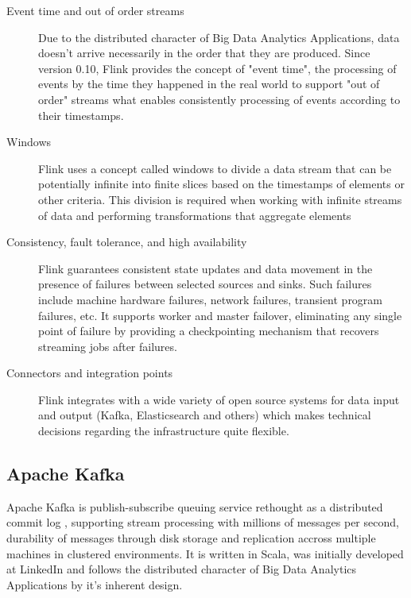 \begin{description}
    \item [Event time and out of order streams]
    Due to the distributed character of Big Data Analytics Applications, data doesn't arrive
    necessarily in the order that they are produced. Since version 0.10, Flink provides the
    concept of "event time", the processing of events by the time they happened in the real
    world to support "out of order" streams what enables consistently processing of events
    according to their timestamps.

    \item [Windows]
    Flink uses a concept called windows to divide a data stream that can be potentially infinite
    into finite slices based on the timestamps of elements or other criteria. This division
    is required when working with infinite streams of data and performing transformations that
    aggregate elements

    \item [Consistency, fault tolerance, and high availability]
    Flink guarantees consistent state updates and data movement in the presence of failures
    between selected sources and sinks. Such failures include machine hardware failures, network
    failures, transient program failures, etc. It supports worker and master failover,
    eliminating any single point of failure by providing  a checkpointing mechanism that recovers
    streaming jobs after failures.

    \item [Connectors and integration points]
    Flink integrates with a wide variety of open source systems for data input and output (Kafka,
    Elasticsearch and others) which makes technical decisions regarding the infrastructure quite flexible.
\end{description}

\subsection{Apache Kafka}

Apache Kafka is publish-subscribe queuing service rethought as a distributed commit log \cite{Kafka16},
supporting stream processing with millions of messages per second, durability of messages through disk
storage and replication accross multiple machines in clustered environments. It is written in Scala, was
initially developed at LinkedIn and follows the distributed character of Big Data Analytics Applications
by it's inherent design.

